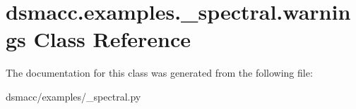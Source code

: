 \hypertarget{classdsmacc_1_1examples_1_1__spectral_1_1warnings}{}\section{dsmacc.\+examples.\+\_\+spectral.\+warnings Class Reference}
\label{classdsmacc_1_1examples_1_1__spectral_1_1warnings}


The documentation for this class was generated from the following file\+:\begin{DoxyCompactItemize}
\item 
dsmacc/examples/\+\_\+spectral.\+py\end{DoxyCompactItemize}
